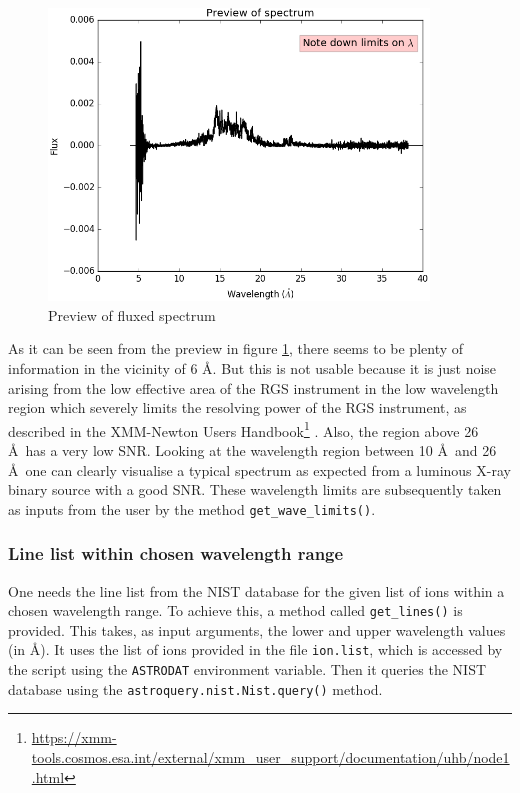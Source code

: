                 \begin{figure}[h!]
    				\centering
    				\includegraphics[width=0.9\textwidth]{images/mrvel_preview}
    				\caption{Preview of fluxed spectrum}
    				\label{fig:spec-preview}
			    \end{figure}
			    
			    As it can be seen from the preview in figure \ref{fig:spec-preview}, there seems to be plenty of information in the vicinity of 6 \AA. But this is not usable because it is just noise arising from the low effective area of the RGS instrument in the low wavelength region which severely limits the resolving power of the RGS instrument, as described in the XMM-Newton Users Handbook\footnote{\url{https://xmm-tools.cosmos.esa.int/external/xmm_user_support/documentation/uhb/node1.html}} \cite{xmmUserHandbook}. Also, the region above 26 \AA~has a very low SNR. Looking at the wavelength region between 10 \AA~and 26 \AA~one can clearly visualise a typical spectrum as expected from a luminous X-ray binary source with a good SNR. These wavelength limits are subsequently taken as inputs from the user by the method \texttt{get\_wave\_limits()}.
			 
            \subsubsection{Line list within chosen wavelength range} \label{tool:rgs-files:demonstration:linelist}
                One needs the line list from the NIST database for the given list of ions within a chosen wavelength range. To achieve this, a method called \texttt{get\_lines()} is provided. This takes, as input arguments, the lower and upper wavelength values (in \AA). It uses the list of ions provided in the file \texttt{ion.list}, which is accessed by the script using the \texttt{ASTRODAT} environment variable. Then it queries the NIST database using the \texttt{astroquery.nist.Nist.query()} method.
                
